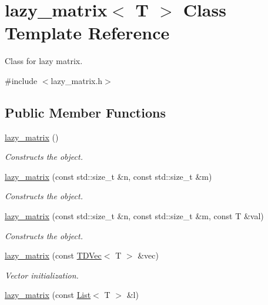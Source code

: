 \hypertarget{classlazy__matrix}{}\section{lazy\+\_\+matrix$<$ T $>$ Class Template Reference}
\label{classlazy__matrix}


Class for lazy matrix.  




{\ttfamily \#include $<$lazy\+\_\+matrix.\+h$>$}

\subsection*{Public Member Functions}
\begin{DoxyCompactItemize}
\item 
\mbox{\hyperlink{classlazy__matrix_aef0a15c588094c4dadf2bd879be78d43}{lazy\+\_\+matrix}} ()
\begin{DoxyCompactList}\small\item\em Constructs the object. \end{DoxyCompactList}\item 
\mbox{\hyperlink{classlazy__matrix_a354b6e228f5bc0991f759161e081f008}{lazy\+\_\+matrix}} (const std\+::size\+\_\+t \&n, const std\+::size\+\_\+t \&m)
\begin{DoxyCompactList}\small\item\em Constructs the object. \end{DoxyCompactList}\item 
\mbox{\hyperlink{classlazy__matrix_a33321976a3585130b7fc5a5da0735d9c}{lazy\+\_\+matrix}} (const std\+::size\+\_\+t \&n, const std\+::size\+\_\+t \&m, const T \&val)
\begin{DoxyCompactList}\small\item\em Constructs the object. \end{DoxyCompactList}\item 
\mbox{\hyperlink{classlazy__matrix_a29db22d791029e5d2e0a8d4d7d7857db}{lazy\+\_\+matrix}} (const \mbox{\hyperlink{lazy__matrix_8h_ab6e3d9072e9f4b56c531bef4d02d2652}{T\+D\+Vec}}$<$ T $>$ \&vec)
\begin{DoxyCompactList}\small\item\em Vector initialization. \end{DoxyCompactList}\item 
\mbox{\hyperlink{classlazy__matrix_ab8457360fa70960b71dc2039d0c2e64d}{lazy\+\_\+matrix}} (const \mbox{\hyperlink{lazy__matrix_8h_a9421479667ba20cc5361aa756ae056d7}{List}}$<$ T $>$ \&l)

\end{DoxyCompactItemize}
